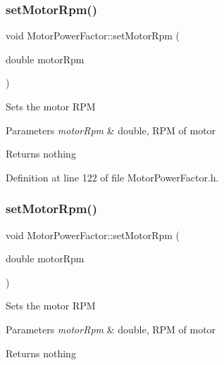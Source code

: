 \subsubsection{\texorpdfstring{set\+Motor\+Rpm()}{setMotorRpm()}\hspace{0.1cm}{\footnotesize\ttfamily [1/3]}}
{\footnotesize\ttfamily void Motor\+Power\+Factor\+::set\+Motor\+Rpm (\begin{DoxyParamCaption}\item[{double}]{motor\+Rpm }\end{DoxyParamCaption})\hspace{0.3cm}{\ttfamily [inline]}}

Sets the motor R\+PM


\begin{DoxyParams}{Parameters}
{\em motor\+Rpm} & double, R\+PM of motor\\
\hline
\end{DoxyParams}
\begin{DoxyReturn}{Returns}
nothing 
\end{DoxyReturn}


Definition at line 122 of file Motor\+Power\+Factor.\+h.

\mbox{\label{class_motor_power_factor_a4154bf52c6c9c9e5fb2f0985d7ae3531}} 
\subsubsection{\texorpdfstring{set\+Motor\+Rpm()}{setMotorRpm()}\hspace{0.1cm}{\footnotesize\ttfamily [2/3]}}
{\footnotesize\ttfamily void Motor\+Power\+Factor\+::set\+Motor\+Rpm (\begin{DoxyParamCaption}\item[{double}]{motor\+Rpm }\end{DoxyParamCaption})\hspace{0.3cm}{\ttfamily [inline]}}

Sets the motor R\+PM


\begin{DoxyParams}{Parameters}
{\em motor\+Rpm} & double, R\+PM of motor\\
\hline
\end{DoxyParams}
\begin{DoxyReturn}{Returns}
nothing 
\end{DoxyReturn}


